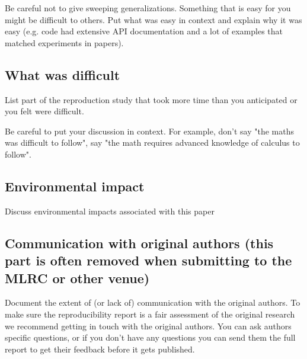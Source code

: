 \documentclass[10pt]{article} %
\begin{document}
	Be careful not to give sweeping generalizations. Something that is easy for you might be difficult to others. Put what was easy in context and explain why it was easy (e.g. code had extensive API documentation and a lot of examples that matched experiments in papers). 
	
	\subsection{What was difficult}
	List part of the reproduction study that took more time than you anticipated or you felt were difficult. 
	
	Be careful to put your discussion in context. For example, don't say "the maths was difficult to follow", say "the math requires advanced knowledge of calculus to follow". 

    \subsection{Environmental impact}
    Discuss environmental impacts associated with this paper 
	
	\subsection{Communication with original authors (this part is often removed when submitting to the MLRC or other venue)}
	Document the extent of (or lack of) communication with the original authors. To make sure the reproducibility report is a fair assessment of the original research we recommend getting in touch with the original authors. You can ask authors specific questions, or if you don't have any questions you can send them the full report to get their feedback before it gets published. 
	
\end{document}
